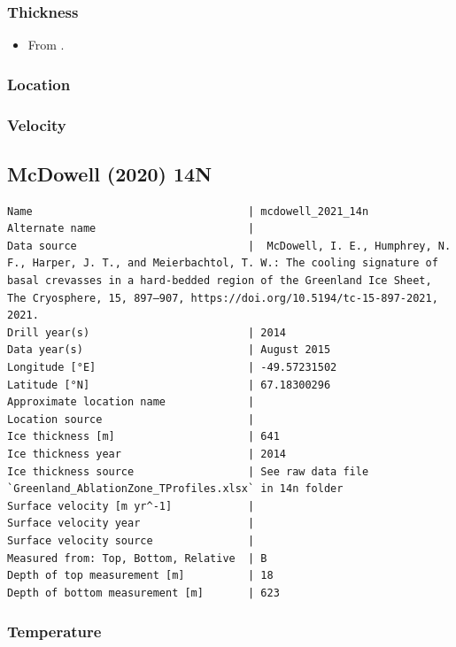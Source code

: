 \documentclass[article,a4paper,times,11pt,twoside]{article}
\begin{document}
\subsubsection{Thickness}
\label{sec:org3a9e99a}

\begin{itemize}
\item From \textcite{luthi_2002}.
\end{itemize}

\subsubsection{Location}
\label{sec:org9629856}

\subsubsection{Velocity}
\label{sec:orgdcb9bb0}
\clearpage
\subsection{McDowell (2020) 14N}
\label{sec:org7f1b321}
\begin{verbatim}
Name                                  | mcdowell_2021_14n
Alternate name                        | 
Data source                           |  McDowell, I. E., Humphrey, N. F., Harper, J. T., and Meierbachtol, T. W.: The cooling signature of basal crevasses in a hard-bedded region of the Greenland Ice Sheet, The Cryosphere, 15, 897–907, https://doi.org/10.5194/tc-15-897-2021, 2021.
Drill year(s)                         | 2014
Data year(s)                          | August 2015
Longitude [°E]                        | -49.57231502
Latitude [°N]                         | 67.18300296
Approximate location name             | 
Location source                       | 
Ice thickness [m]                     | 641
Ice thickness year                    | 2014
Ice thickness source                  | See raw data file `Greenland_AblationZone_TProfiles.xlsx` in 14n folder
Surface velocity [m yr^-1]            | 
Surface velocity year                 | 
Surface velocity source               | 
Measured from: Top, Bottom, Relative  | B
Depth of top measurement [m]          | 18
Depth of bottom measurement [m]       | 623
\end{verbatim}

\subsubsection{Temperature}
\label{sec:orgf58b814}
\end{document}
